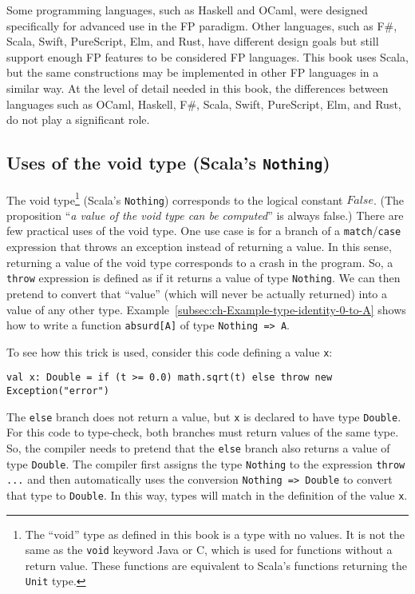 Some programming languages, such as Haskell and OCaml, were designed
specifically for advanced use in the FP paradigm. Other languages,
such as F\#, Scala, Swift, PureScript, Elm, and Rust, have different
design goals but still support enough FP features to be considered
FP languages. This book uses Scala, but the same constructions may
be implemented in other FP languages in a similar way. At the level
of detail needed in this book, the differences between languages such
as OCaml, Haskell, F\#, Scala, Swift, PureScript, Elm, and Rust, do
not play a significant role.

\subsection{Uses of the void type (Scala\textsf{'}s \texttt{Nothing})}

The void type\footnote{The \textsf{``}void\textsf{''} type as defined in this book is a type with no values.
It is not the same as the \lstinline!void! keyword Java or C, which
is used for functions without a return value. These functions are
equivalent to Scala\textsf{'}s functions returning the \lstinline!Unit! type.} (Scala\textsf{'}s \lstinline!Nothing!) corresponds to the logical constant
$False$. (The proposition \textsf{``}\emph{a value of the void type can be
computed}\textsf{''} is always false.) There are few practical uses of the
void type. One use case is for a branch of a \lstinline!match!/\lstinline!case!
expression that throws an exception instead of returning
a value. In this sense, returning a value of the void type corresponds
to a crash in the program. So, a \lstinline!throw! expression is
defined as if it returns a value of type \lstinline!Nothing!. We
can then pretend to convert that \textsf{``}value\textsf{''} (which will never be
actually returned) into a value of any other type. Example~\ref{subsec:ch-Example-type-identity-0-to-A}
shows how to write a function \lstinline!absurd[A]! of type \lstinline!Nothing => A!.

To see how this trick is used, consider this code defining a value
\lstinline!x!:
\begin{lstlisting}
val x: Double = if (t >= 0.0) math.sqrt(t) else throw new Exception("error")
\end{lstlisting}
The \lstinline!else! branch does not return a value, but \lstinline!x!
is declared to have type \lstinline!Double!. For this code to type-check,
both branches must return values of the same type. So, the compiler
needs to pretend that the \lstinline!else! branch also returns a
value of type \lstinline!Double!. The compiler first assigns the
type \lstinline!Nothing! to the expression \lstinline!throw ...!
and then automatically uses the conversion \lstinline!Nothing => Double!
to convert that type to \lstinline!Double!. In this way, types will
match in the definition of the value \lstinline!x!. 


